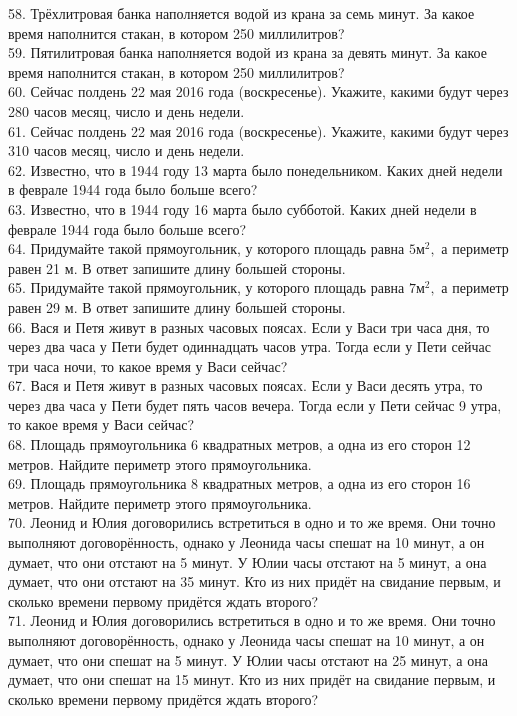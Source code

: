 \documentclass[12pt]{article}
\begin{document}
58. Трёхлитровая банка наполняется водой из крана за семь минут. За какое время наполнится стакан, в котором 250 миллилитров?\\
59. Пятилитровая банка наполняется водой из крана за девять минут. За какое время наполнится стакан, в котором 250 миллилитров?\\
60. Сейчас полдень 22 мая 2016 года (воскресенье). Укажите, какими будут через 280 часов месяц, число и день недели.\\
61. Сейчас полдень 22 мая 2016 года (воскресенье). Укажите, какими будут через 310 часов месяц, число и день недели.\\
62. Известно, что в 1944 году 13 марта было понедельником. Каких дней недели в феврале 1944 года было больше всего?\\
63. Известно, что в 1944 году 16 марта было субботой. Каких дней недели в феврале 1944 года было больше всего?\\
64. Придумайте такой прямоугольник, у которого площадь равна $5\text{м}^2,$ а периметр равен 21 м. В ответ запишите длину большей стороны.\\
65. Придумайте такой прямоугольник, у которого площадь равна $7\text{м}^2,$ а периметр равен 29 м. В ответ запишите длину большей стороны.\\
66. Вася и Петя живут в разных часовых поясах. Если у Васи три часа дня, то через два часа у Пети будет одиннадцать часов утра. Тогда если у Пети сейчас три часа ночи, то какое время у Васи сейчас?\\
67. Вася и Петя живут в разных часовых поясах. Если у Васи десять утра, то через два часа у Пети будет пять часов вечера. Тогда если у Пети сейчас 9 утра, то какое время у Васи сейчас?\\
68. Площадь прямоугольника 6 квадратных метров, а одна из его сторон 12 метров. Найдите периметр этого прямоугольника.\\
69. Площадь прямоугольника 8 квадратных метров, а одна из его сторон 16 метров. Найдите периметр этого прямоугольника.\\
70. Леонид и Юлия договорились встретиться в одно и то же время. Они точно выполняют договорённость, однако у Леонида часы спешат на 10 минут, а он думает, что они отстают на 5 минут. У Юлии часы отстают на 5 минут, а она думает, что они отстают на 35 минут. Кто из них придёт на свидание первым, и сколько времени первому придётся ждать второго?\\
71. Леонид и Юлия договорились встретиться в одно и то же время. Они точно выполняют договорённость, однако у Леонида часы спешат на 10 минут, а он думает, что они спешат на 5 минут. У Юлии часы отстают на 25 минут, а она думает, что они спешат на 15 минут. Кто из них придёт на свидание первым, и сколько времени первому придётся ждать второго?\\
\end{document}
